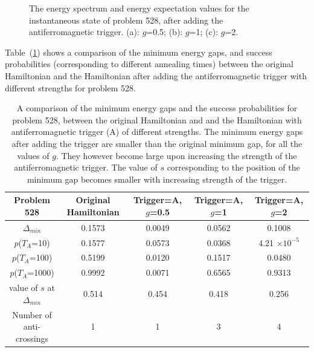 \documentclass[../main.tex]{subfiles}
\begin{document}
\begin{figure}
\caption{The energy spectrum and energy expectation values for the instantaneous state of problem 528, after adding the antiferromagnetic trigger. (a): $g$=0.5; (b): $g$=1; (c): $g$=2.}
\label{fig:a7}
\end{figure}

Table~(\ref{tab:a3}) shows a comparison of the minimum energy gaps, and success probabilities (corresponding to different annealing times) between the original Hamiltonian and the Hamiltonian after adding the antiferromagnetic trigger with different strengths for problem 528. 

\begin{table}[H]
\centering
\renewcommand{\arraystretch}{1.5}
\begin{tabular}{|c|c|c|c|c|}
\hline 
Problem 528 & Original Hamiltonian & Trigger=A, $g$=0.5 & Trigger=A, $g$=1 & Trigger=A, $g$=2 \\ 
\hline 
$\Delta_{min}$ & 0.1573 & 0.0049 & 0.0562 & 0.1008 \\ 
\hline 
$p$($T_A$=10) & 0.1577 & 0.0573 & 0.0368 & 4.21 $\times 10^{-5}$\\ 
\hline 
$p$($T_A$=100) & 0.5199 & 0.0120 & 0.1517 & 0.0480 \\ 
\hline 
$p$($T_A$=1000) & 0.9992 & 0.0071 & 0.6565 & 0.9313 \\ 
\hline 
value of $s$ at $\Delta_{min}$ & 0.514 & 0.454 & 0.418 & 0.256 \\ 
\hline 
Number of anti-crossings & 1 & 1 & 3 & 4 \\
\hline
\end{tabular} 
\caption{A comparison of the minimum energy gaps and the success probabilities for problem 528, between the original Hamiltonian and and the Hamiltonian with antiferromagnetic trigger (A) of different strengths. The minimum energy gaps after adding the trigger are smaller than the original minimum gap, for all the values of $g$. They however become large upon increasing the strength of the antiferromagnetic trigger. The value of $s$ corresponding to the position of the minimum gap becomes smaller with increasing strength of the trigger.}
\label{tab:a3}
\end{table}
\end{document}
